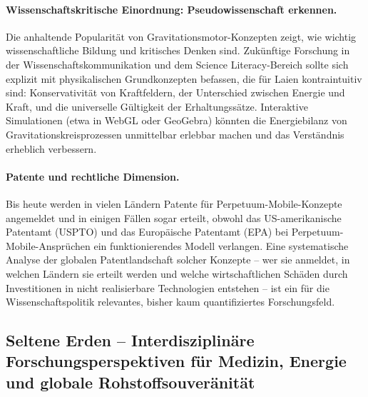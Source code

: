 ﻿\documentclass[12pt, a4paper]{report}
\theoremstyle{definition}
\theoremstyle{remark}
\begin{document}
\paragraph{Wissenschaftskritische Einordnung: Pseudowissenschaft erkennen.}
Die anhaltende Popularität von Gravitationsmotor-Konzepten zeigt, wie wichtig
wissenschaftliche Bildung und kritisches Denken sind. Zukünftige Forschung in
der Wissenschaftskommunikation und dem Science Literacy-Bereich sollte sich
explizit mit physikalischen Grundkonzepten befassen, die für Laien kontraintuitiv
sind: Konservativität von Kraftfeldern, der Unterschied zwischen Energie und
Kraft, und die universelle Gültigkeit der Erhaltungssätze. Interaktive Simulationen
(etwa in WebGL oder GeoGebra) könnten die Energiebilanz von Gravitationskreisprozessen
unmittelbar erlebbar machen und das Verständnis erheblich verbessern.

\paragraph{Patente und rechtliche Dimension.}
Bis heute werden in vielen Ländern Patente für Perpetuum-Mobile-Konzepte angemeldet
und in einigen Fällen sogar erteilt, obwohl das US-amerikanische Patentamt (USPTO)
und das Europäische Patentamt (EPA) bei Perpetuum-Mobile-Ansprüchen ein
funktionierendes Modell verlangen. Eine systematische Analyse der globalen
Patentlandschaft solcher Konzepte -- wer sie anmeldet, in welchen Ländern sie
erteilt werden und welche wirtschaftlichen Schäden durch Investitionen in
nicht realisierbare Technologien entstehen -- ist ein für die Wissenschaftspolitik
relevantes, bisher kaum quantifiziertes Forschungsfeld.

\subsection{Seltene Erden -- Interdisziplinäre Forschungsperspektiven
               für Medizin, Energie und globale Rohstoffsouveränität}
\label{ssec:ausblick_seltene_erden}
\end{document}

